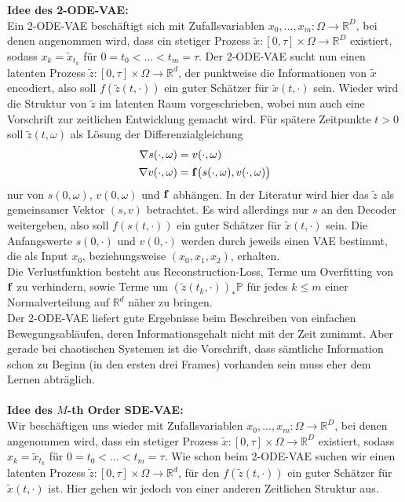 \documentclass[12pt]{article}
\newcommand{\R}{\mathbb{R}}
\newcommand{\tx}{\widetilde{x}}
\newcommand{\tz}{\widetilde{z}}
\newcommand{\bP}{\mathbb{P}}
\newcommand{\bbf}{\bold{f}}
\begin{document}
	\newpage\noindent
	\textbf{Idee des 2-ODE-VAE:}\\
	Ein 2-ODE-VAE beschäftigt sich mit Zufallsvariablen $x_0,...,x_m : \Omega \rightarrow \R^D$, bei denen angenommen wird, dass ein stetiger Prozess $\tx : [0,\tau] \times \Omega \rightarrow \R^D$ existiert, sodass $x_k = \tx_{t_k}$ für $0=t_0<...<t_m=\tau$. Der 2-ODE-VAE sucht nun einen latenten Prozess $\tz: [0,\tau] \times \Omega \rightarrow \R^d$, der punktweise die Informationen von $\tx$ encodiert, also soll $f(\tz(t,\cdot))$ ein guter Schätzer für $\tx(t,\cdot)$ sein. Wieder wird die Struktur von $\tz$ im latenten Raum vorgeschrieben, wobei nun auch eine Vorschrift zur zeitlichen Entwicklung gemacht wird. Für spätere Zeitpunkte $t>0$ soll $\tz(t,\omega)$ als Lösung der Differenzialgleichung
	\begin{align*}
	\nabla s(\cdot,\omega) &= v(\cdot,\omega)\\
	\nabla v(\cdot,\omega) &= \bbf\big(s(\cdot,\omega),v(\cdot,\omega)\big)
	\end{align*}
	nur von $s(0,\omega)$, $v(0,\omega)$ und $\bbf$ abhängen. In der Literatur wird hier das $\tz$ als gemeinsamer Vektor $(s,v)$ betrachtet. Es wird allerdings nur $s$ an den Decoder weitergeben, also soll $f(s(t,\cdot))$ ein guter Schätzer für $\tx(t,\cdot)$ sein. Die Anfangswerte $s(0,\cdot)$ und $v(0,\cdot)$ werden durch jeweils einen VAE bestimmt, die als Input $x_0$, beziehungsweise $(x_0,x_1,x_2)$, erhalten.\\
	Die Verlustfunktion besteht aus Reconstruction-Loss, Terme um Overfitting von $\bbf$ zu verhindern, sowie Terme um $(\tz(t_k,\cdot))_*\bP$ für jedes $k \leq m$ einer Normalverteilung auf $\R^d$ näher zu bringen.\\
	Der 2-ODE-VAE liefert gute Ergebnisse beim Beschreiben von einfachen Bewegungsabläufen, deren Informationsgehalt nicht mit der Zeit zunimmt. Aber gerade bei chaotischen Systemen ist die Vorschrift, dass sämtliche Information schon zu Beginn (in den ersten drei Frames) vorhanden sein muss eher dem Lernen abträglich.\\
	\\
	\textbf{Idee des $M$-th Order SDE-VAE:}\\
	Wir beschäftigen uns wieder mit Zufallsvariablen $x_0,...,x_m : \Omega \rightarrow \R^D$, bei denen angenommen wird, dass ein stetiger Prozess $\tx : [0,\tau] \times \Omega \rightarrow \R^D$ existiert, sodass $x_k = \tx_{t_k}$ für $0=t_0<...<t_m=\tau$. Wie schon beim 2-ODE-VAE suchen wir einen latenten Prozess $\tz: [0,\tau] \times \Omega \rightarrow \R^d$, für den $f(\tz(t,\cdot))$ ein guter Schätzer für $\tx(t,\cdot)$ ist. Hier gehen wir jedoch von einer anderen Zeitlichen Struktur aus.\\
\end{document}
